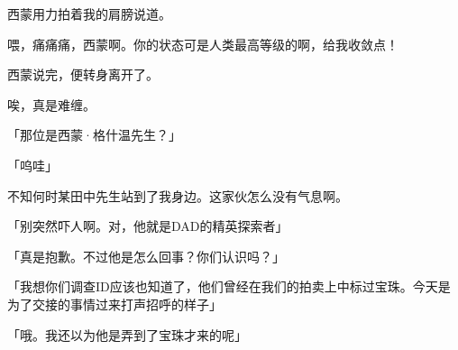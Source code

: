 


西蒙用力拍着我的肩膀说道。

喂，痛痛痛，西蒙啊。你的状态可是人类最高等级的啊，给我收敛点！



西蒙说完，便转身离开了。

唉，真是难缠。

「那位是西蒙·格什温先生？」

「呜哇」

不知何时某田中先生站到了我身边。这家伙怎么没有气息啊。

「别突然吓人啊。对，他就是DAD的精英探索者」

「真是抱歉。不过他是怎么回事？你们认识吗？」

「我想你们调查ID应该也知道了，他们曾经在我们的拍卖上中标过宝珠。今天是为了交接的事情过来打声招呼的样子」

「哦。我还以为他是弄到了宝珠才来的呢」

